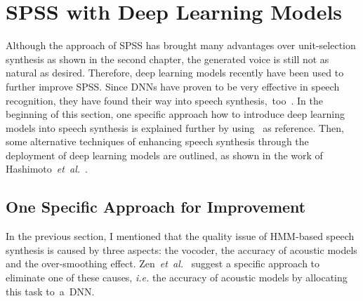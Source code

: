 
\section{\ac{SPSS} with Deep Learning Models}
\label{sec:deepspeech}

Although the approach of \ac{SPSS} has brought many advantages over unit-selection synthesis as shown in the second chapter, the generated voice is still not as natural as desired. Therefore, deep learning models recently have been used to further improve \ac{SPSS}. Since \acfp{DNN} have proven to be very effective in speech recognition, they have found their way into speech synthesis,~too~\cite{hashimoto:effect}. %
In the beginning of this section, one specific approach how to introduce deep learning models into speech synthesis is explained further by using~\cite{zen:deepstatistical} as reference. Then, some alternative techniques of enhancing speech synthesis through the deployment of deep learning models are outlined, as shown in the work of Hashimoto~\textit{et~al.}~\cite{hashimoto:effect}.


\subsection{One Specific Approach for Improvement}
\label{subsec:deepspss}

In the previous section, I mentioned that the quality issue of \ac{HMM}-based speech synthesis is caused by three aspects: the vocoder, the accuracy of acoustic models and the over-smoothing effect. Zen~\textit{et~al.}~\cite{zen:deepstatistical} suggest a specific approach to eliminate one of these causes, \textit{i.e.} the accuracy of acoustic models by allocating this task to~a~\ac{DNN}. 

